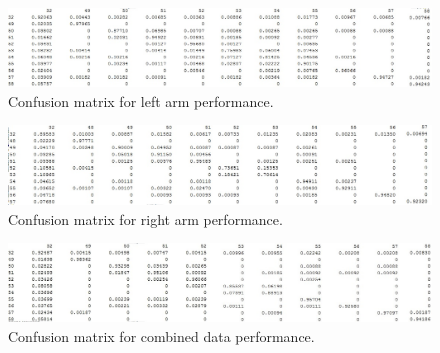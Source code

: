 \documentclass{sig-alternate}
\begin{document}

\begin{figure}[t]
\begin{center}
  \includegraphics[width=1.0\linewidth]{visual_results/nConfkNN_left.jpg}
\end{center}
  \caption{Confusion matrix for left arm performance.}
  \label{fig:conf_left}
\end{figure}

\begin{figure}
\begin{center}
  \includegraphics[width=1.0\linewidth]{visual_results/nConfkNN_right.jpg}
\end{center}
  \caption{Confusion matrix for right arm performance.}
  \label{fig:conf_right}
\end{figure}

\begin{figure}
\begin{center}
  \includegraphics[width=1.0\linewidth]{visual_results/nConfkNN_both.jpg}
\end{center}
  \caption{Confusion matrix for combined data performance.}
  \label{fig:conf_both}
\end{figure}

%


\end{document}
